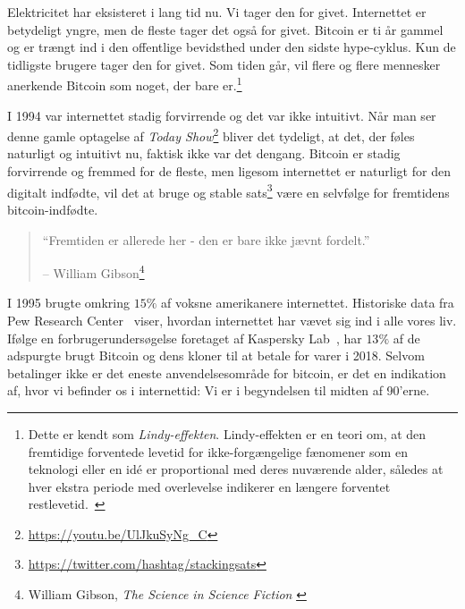 \documentclass[paper=6in:9in,pagesize=pdftex,
               headinclude=on,footinclude=on,12pt]{scrbook}
\begin{document}
Elektricitet har eksisteret i lang tid nu. Vi tager den for givet. Internettet er betydeligt yngre, men de fleste tager det også for givet. Bitcoin er ti år gammel og er trængt ind i den offentlige bevidsthed under den sidste hype-cyklus. Kun de tidligste brugere tager den for givet. Som tiden går, vil flere og flere mennesker anerkende Bitcoin som noget, der bare er.\footnote{Dette er kendt som \textit{Lindy-effekten}. Lindy-effekten er en teori om, at den fremtidige forventede levetid for ikke-forgængelige fænomener som en teknologi eller en id\'e er proportional med deres nuværende alder, således at hver ekstra periode med overlevelse indikerer en længere forventet restlevetid.~\cite{wiki:lindy}}

I 1994 var internettet stadig forvirrende og det var ikke intuitivt. Når man ser denne gamle optagelse af \textit{Today Show}\footnote{\url{https://youtu.be/UlJkuSyNg_C}} bliver det tydeligt, at det, der føles naturligt og intuitivt nu, faktisk ikke var det dengang. Bitcoin er stadig forvirrende og fremmed for de fleste, men ligesom internettet er naturligt for den digitalt indfødte, vil det at bruge og stable sats\footnote{\url{https://twitter.com/hashtag/stackingsats}} være en selvfølge for fremtidens bitcoin-indfødte.\begin{quotation}\begin{samepage} \enquote{Fremtiden er allerede her - den er bare ikke jævnt fordelt.} \begin{flushright} -- William Gibson\footnote{William Gibson, \textit{The Science in Science Fiction} \cite{william-gibson}}
\end{flushright}\end{samepage}\end{quotation}

I 1995 brugte omkring $15\%$ af voksne amerikanere internettet. Historiske data fra Pew Research Center~\cite{pew-research} viser, hvordan internettet har vævet sig ind i alle vores liv. Ifølge en forbrugerundersøgelse foretaget af Kaspersky Lab~\cite{web:kaspersky}, har $13\%$ af de adspurgte brugt Bitcoin og dens kloner til at betale for varer i 2018. Selvom betalinger ikke er det eneste anvendelsesområde for bitcoin, er det en indikation af, hvor vi befinder os i internettid: Vi er i begyndelsen til midten af 90'erne.
\end{document}
